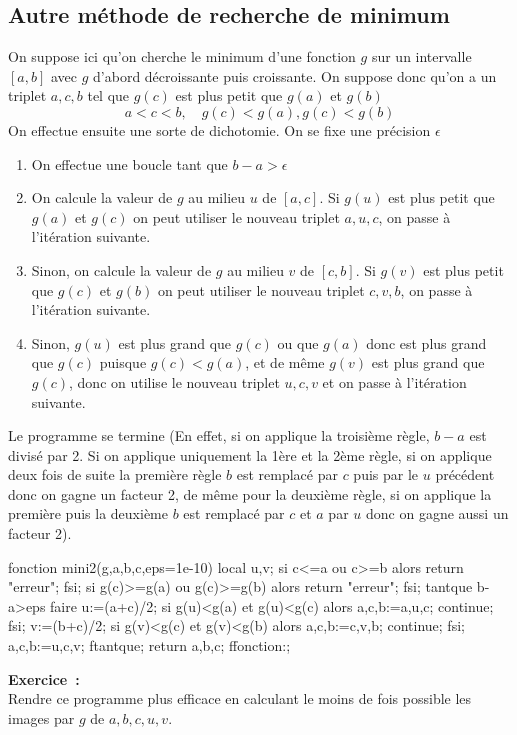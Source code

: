 \documentclass[12pt,a4paper]{book}
\begin{document}
\begin{giacjshere}
\subsection{Autre m\'ethode de recherche de minimum}
On suppose ici qu'on cherche le minimum d'une fonction $g$ sur
un intervalle $[a,b]$ avec $g$ d'abord d\'ecroissante puis croissante.
On suppose donc qu'on a un triplet $a,c,b$ tel que 
$g(c)$ est plus petit que $g(a)$ et $g(b)$
$$ a<c<b, \quad  g(c)<g(a), g(c)<g(b)$$
On effectue ensuite une sorte de dichotomie. On se fixe une pr\'ecision
$\epsilon$
\begin{enumerate}
\item On effectue une boucle tant que $b-a>\epsilon$
\item On calcule la valeur de $g$ au milieu $u$ de $[a,c]$.
Si $g(u)$ est plus petit que $g(a)$ et $g(c)$ on peut utiliser
le nouveau triplet $a,u,c$, on passe \`a l'it\'eration suivante.
\item Sinon, on calcule la valeur de $g$ au milieu $v$ de $[c,b]$.
Si $g(v)$ est plus petit que $g(c)$ et $g(b)$ on peut utiliser
le nouveau triplet $c,v,b$, on passe \`a l'it\'eration suivante.
\item Sinon, $g(u)$ est plus grand que $g(c)$ ou que $g(a)$ donc
est plus grand que $g(c)$ puisque $g(c)<g(a)$, et de m\^eme $g(v)$
est plus grand que $g(c)$, donc on utilise le nouveau triplet $u,c,v$
et on passe \`a l'it\'eration suivante.
\end{enumerate}
Le programme se termine (En effet, si on applique la troisi\`eme r\`egle,
$b-a$ est divis\'e par 2. Si on applique uniquement la 1\`ere et la
2\`eme r\`egle, si on applique deux fois de suite la premi\`ere r\`egle
$b$ est remplac\'e par $c$ puis par le $u$ pr\'ec\'edent donc
on gagne un facteur 2, de m\^eme pour la deuxi\`eme r\`egle, si
on applique la premi\`ere puis la deuxi\`eme $b$ est remplac\'e par $c$
et $a$ par $u$ donc on gagne aussi un facteur 2).
\begin{giaconload}
fonction mini2(g,a,b,c,eps=1e-10)
  local u,v;
  si c<=a ou c>=b alors return "erreur"; fsi;
  si g(c)>=g(a) ou g(c)>=g(b) alors return "erreur"; fsi;
  tantque b-a>eps faire
    u:=(a+c)/2;
    si g(u)<g(a) et g(u)<g(c) alors a,c,b:=a,u,c; continue; fsi;
    v:=(b+c)/2;
    si g(v)<g(c) et g(v)<g(b) alors a,c,b:=c,v,b; continue; fsi;
    a,c,b:=u,c,v;
  ftantque;
  return a,b,c;
ffonction:;
\end{giaconload}
{\bf Exercice~:} \\
Rendre ce programme plus efficace en calculant le moins de fois
possible les images par $g$ de $a,b,c,u,v$.


\end{giacjshere}
\end{document}
